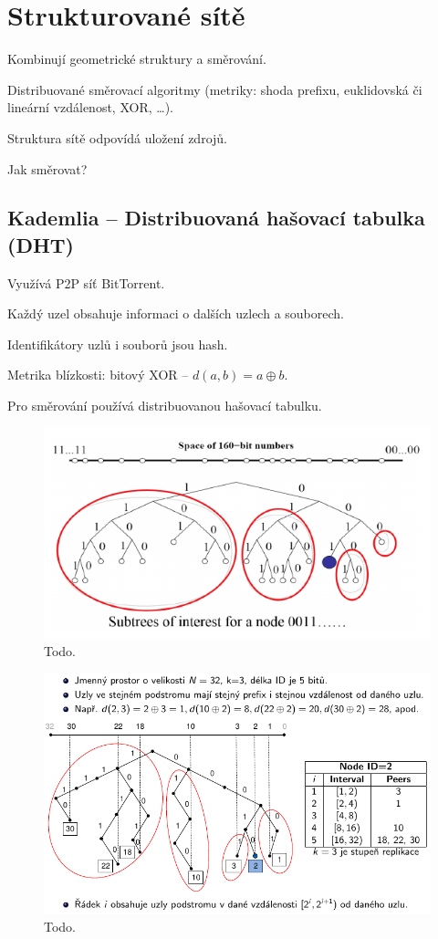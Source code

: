 
\section{Strukturované sítě}

\begin{compactitem}
    \item Kombinují geometrické struktury a směrování.
    \item Distribuované směrovací algoritmy (metriky: shoda prefixu, euklidovská či lineární vzdálenost, XOR, \dots).
    \item Struktura sítě odpovídá uložení zdrojů.
    \item Jak směrovat?
\end{compactitem}

\subsection{Kademlia -- Distribuovaná hašovací tabulka (DHT)}

\begin{compactitem}
    \item Využívá P2P síť BitTorrent.
    \item Každý uzel obsahuje informaci o dalších uzlech a souborech.
    \item Identifikátory uzlů i souborů jsou hash.
    \item Metrika blízkosti: bitový XOR -- $d(a, b) = a \oplus b$.
    \item Pro směrování používá distribuovanou hašovací tabulku.
\end{compactitem}


\begin{figure}[H]
    \centering
    \includegraphics[width=0.6\linewidth]{dht_1.pdf}
    \caption{Todo.}
\end{figure}

\begin{figure}[H]
    \centering
    \includegraphics[width=0.6\linewidth]{dht_2.pdf}
    \caption{Todo.}
\end{figure}
